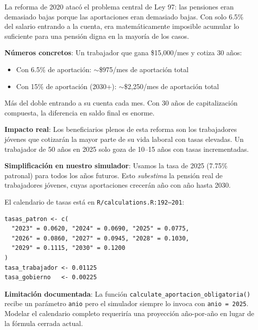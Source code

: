 \documentclass[11pt,a4paper]{report}
\begin{document}
\begin{tcolorbox}[colback=green!5!white, colframe=green!50!black, title=\textbf{Intuici\'on}]
La reforma de 2020 atac\'o el problema central de Ley 97: las pensiones eran demasiado bajas porque las aportaciones eran demasiado bajas. Con solo 6.5\% del salario entrando a la cuenta, era matem\'aticamente imposible acumular lo suficiente para una pensi\'on digna en la mayor\'ia de los casos.

\textbf{N\'umeros concretos}: Un trabajador que gana \$15,000/mes y cotiza 30 a\~nos:
\begin{itemize}[nosep]
\item Con 6.5\% de aportaci\'on: $\sim$\$975/mes de aportaci\'on total
\item Con 15\% de aportaci\'on (2030+): $\sim$\$2,250/mes de aportaci\'on total
\end{itemize}
M\'as del doble entrando a su cuenta cada mes. Con 30 a\~nos de capitalizaci\'on compuesta, la diferencia en saldo final es enorme.

\textbf{Impacto real}: Los beneficiarios plenos de esta reforma son los trabajadores j\'ovenes que cotizar\'an la mayor parte de su vida laboral con tasas elevadas. Un trabajador de 50 a\~nos en 2025 solo goza de 10--15 a\~nos con tasas incrementadas.

\textbf{Simplificaci\'on en nuestro simulador}: Usamos la tasa de 2025 (7.75\% patronal) para todos los a\~nos futuros. Esto \emph{subestima} la pensi\'on real de trabajadores j\'ovenes, cuyas aportaciones crecer\'an a\~no con a\~no hasta 2030.
\end{tcolorbox}

\begin{tcolorbox}[colback=orange!5!white, colframe=orange!75!black, title=\textbf{Aplicaci\'on en C\'odigo}]
El calendario de tasas est\'a en \texttt{R/calculations.R:192--201}:

\begin{lstlisting}
tasas_patron <- c(
  "2023" = 0.0620, "2024" = 0.0690, "2025" = 0.0775,
  "2026" = 0.0860, "2027" = 0.0945, "2028" = 0.1030,
  "2029" = 0.1115, "2030" = 0.1200
)
tasa_trabajador <- 0.01125
tasa_gobierno   <- 0.00225
\end{lstlisting}

\textbf{Limitaci\'on documentada}: La funci\'on \texttt{calculate\_aportacion\_obligatoria()} recibe un par\'ametro \texttt{anio} pero el simulador siempre lo invoca con \texttt{anio = 2025}. Modelar el calendario completo requerir\'ia una proyecci\'on a\~no-por-a\~no en lugar de la f\'ormula cerrada actual.
\end{tcolorbox}
\end{document}
